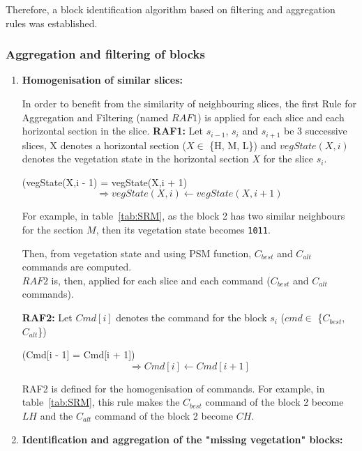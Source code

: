 \documentclass[preprint,3p,times,twocolumn]{elsarticle}
\begin{document}
Therefore, a block identification algorithm based on filtering and aggregation rules was established.

\subsubsection{Aggregation and filtering of blocks}

\begin{enumerate}

\item \textbf{Homogenisation of similar slices:}

In order to benefit from the similarity of neighbouring slices, the first Rule for Aggregation and Filtering (named $RAF1$) is applied for each slice and each horizontal section in the slice.
\textbf{RAF1:}
Let $ s_{i-1} $, $ s_{i}$ and $ s_{i+1}$ be 3 successive slices, X denotes a horizontal section ($X \in$ \{H, M, L\}) 
and $vegState(X,i)$ denotes the vegetation state in the horizontal section $X$ for the slice $s_{i}$. \\

\begin{mdframed}
	(vegState(X,i - 1) = vegState(X,i + 1) 
	\[ 
	\Rightarrow  vegState(X,i) \leftarrow vegState(X,i + 1)
	\] 
\end{mdframed}


For example, in table~\ref{tab:SRM}, as the block 2 has two similar neighbours for the section $M$, then its vegetation state becomes \texttt{1011}.

Then, from vegetation state and using PSM function, $C_{best}$ and $C_{alt}$ commands are computed. \\
$RAF2$ is, then, applied for each slice and each command ($C_{best}$ and $C_{alt}$ commands). 


\textbf{RAF2:} Let $Cmd [i]$ denotes the command for the block $s_i$ ($cmd \in$ \{$C_{best}$, $C_{alt}$\}) \\
\begin{mdframed}
	(Cmd[i - 1] = Cmd[i + 1])
	\[  \Rightarrow  Cmd[i] \leftarrow Cmd[i + 1]\] 
\end{mdframed}

RAF2 is defined for the homogenisation of commands. For example, in table~\ref{tab:SRM}, this rule makes the $C_{best}$ command of the block 2 become $LH$ and the $C_{alt}$ command of the block 2 become $CH$.
\item \textbf{Identification and aggregation of the "missing vegetation" blocks:} 


\end{enumerate}
\end{document}
